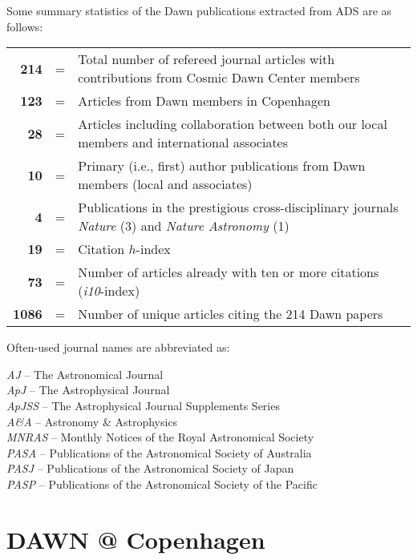 \documentclass{article}
\begin{document}
Some summary statistics of the Dawn publications extracted from ADS are as follows: 

\newcommand\tsep{=}

\hspace{0.5cm}\begin{tabularx}{\textwidth}{ r p{0.1cm} l }
    
\textbf{214} & \tsep &  Total number of refereed journal articles with contributions from Cosmic Dawn Center members \\
\textbf{123} & \tsep &  Articles from Dawn members in Copenhagen \\
\textbf{28} & \tsep &  Articles including collaboration between both our local members and international associates \\
\textbf{10} & \tsep &  Primary (i.e., first) author publications from Dawn members (local and associates) \\
\textbf{4} & \tsep &  Publications in the prestigious cross-disciplinary journals \textit{Nature} (3) and \textit{Nature Astronomy} (1) \\
 \textbf{19} & \tsep & Citation $h$-index \\
 \textbf{73} & \tsep & Number of articles already with ten or more citations (\textit{i10}-index) \\
 \textbf{1086} & \tsep & Number of unique articles citing the 214 Dawn papers \\

\end{tabularx}


Often-used journal names are abbreviated as: 

\textit{AJ} -- The Astronomical Journal\\
\textit{ApJ} -- The Astrophysical Journal\\ 
\textit{ApJSS} -- The Astrophysical Journal Supplements Series\\ 
\textit{A\&A} -- Astronomy \& Astrophysics\\ 
\textit{MNRAS} -- Monthly Notices of the Royal Astronomical Society\\ 
\textit{PASA} -- Publications of the Astronomical Society of Australia\\ 
\textit{PASJ} -- Publications of the Astronomical Society of Japan\\ 
\textit{PASP} -- Publications of the Astronomical Society of the Pacific

\section*{DAWN @ Copenhagen}

%


\end{document}
